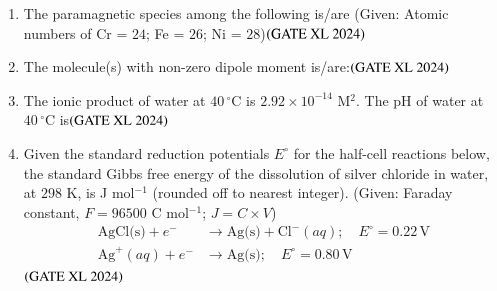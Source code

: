 \documentclass[journal]{IEEEtran}
\begin{document}
\begin{enumerate}
    \item The paramagnetic species among the following is/are  
    (Given: Atomic numbers of Cr = $24$; Fe = $26$; Ni = $28$)\hfill $\left(\text{GATE XL 2024}\right)$
    \begin{enumerate}
    \end{enumerate}

    \item The molecule(s) with non-zero dipole moment is/are:\hfill $\left(\text{GATE XL 2024}\right)$
    \begin{enumerate}
    \end{enumerate}

    \item The ionic product of water at $40\,^\circ$C is $2.92 \times 10^{-14}$ M$^2$. The pH of water at $40\,^\circ$C is\hfill $\left(\text{GATE XL 2024}\right)$

    \item Given the standard reduction potentials $E^\circ$ for the half-cell reactions below, the standard Gibbs free energy of the dissolution of silver chloride in water, at $298$ K, is J mol$^{-1}$ (rounded off to nearest integer).  
    (Given: Faraday constant, $F = 96500$ C mol$^{-1}$; $J = C \times V$)  
    \begin{align}
    \text{AgCl(s)} + e^- &\rightarrow \text{Ag(s)} + \text{Cl}^-(aq); \quad E^\circ = 0.22\,\text{V} \\
    \text{Ag}^+(aq) + e^- &\rightarrow \text{Ag(s)}; \quad E^\circ = 0.80\,\text{V}
    \end{align}
    \hfill $\left(\text{GATE XL 2024}\right)$

\maketitle

\end{enumerate}
\end{document}
